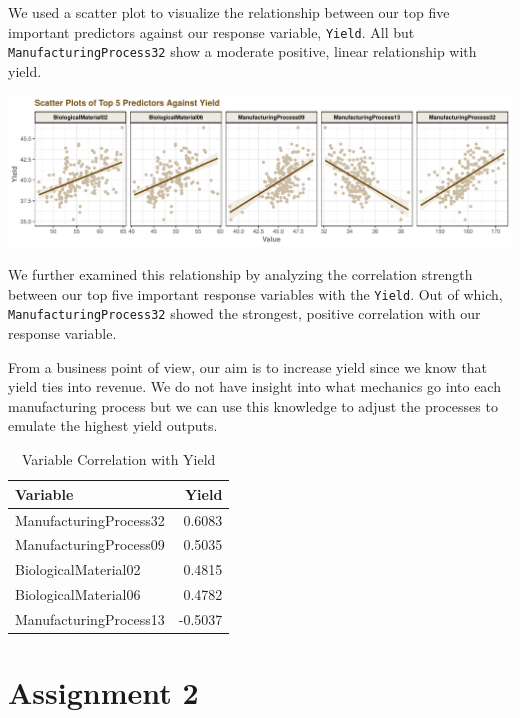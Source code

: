 \documentclass[]{report}
\begin{document}
We used a scatter plot to visualize the relationship between our top
five important predictors against our response variable, \texttt{Yield}.
All but \texttt{ManufacturingProcess32} show a moderate positive, linear
relationship with yield.

\includegraphics{Homework-Two_files/figure-latex/kj-6.3f-1-1.pdf}

We further examined this relationship by analyzing the correlation
strength between our top five important response variables with the
\texttt{Yield}. Out of which, \texttt{ManufacturingProcess32} showed the
strongest, positive correlation with our response variable.

From a business point of view, our aim is to increase yield since we
know that yield ties into revenue. We do not have insight into what
mechanics go into each manufacturing process but we can use this
knowledge to adjust the processes to emulate the highest yield outputs.

\begin{table}[H]

\caption{\label{tab:kj-6.3f-2}Variable Correlation with Yield}
\centering
\fontsize{8}{10}\selectfont
\begin{tabular}[t]{lr}
\toprule
\textbf{Variable} & \textbf{Yield}\\
\midrule
\rowcolor{gray!6}  ManufacturingProcess32 & 0.6083\\
ManufacturingProcess09 & 0.5035\\
\rowcolor{gray!6}  BiologicalMaterial02 & 0.4815\\
BiologicalMaterial06 & 0.4782\\
\rowcolor{gray!6}  ManufacturingProcess13 & -0.5037\\
\bottomrule
\end{tabular}
\end{table}

\hypertarget{AS-2}{%
\chapter*{Assignment 2}\label{AS-2}}
\end{document}
